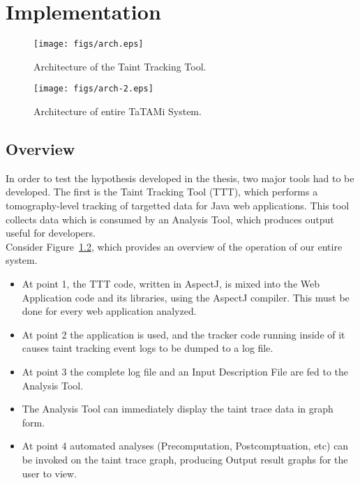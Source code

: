 \documentclass[msc,oneside]{ubcthesis}
\begin{document}
\chapter{Implementation}

\begin{figure}[ht]
  \begin{center}
    \texttt{[image: figs/arch.eps]}
    \caption[Architecture of the Taint Tracking Tool.]{\label{fig:arch} Architecture of the Taint Tracking Tool.}
  \end{center}
\end{figure}

\begin{figure}[ht]
  \begin{center}
    \texttt{[image: figs/arch-2.eps]}
    \caption[Architecture of entire TaTAMi System.]{\label{fig:arch-2} Architecture of entire TaTAMi System.}
  \end{center}
\end{figure}

\section{Overview}

In order to test the hypothesis developed in the thesis, two major tools had to be developed. The first is the Taint Tracking Tool (TTT), which performs a tomography-level tracking of targetted data for Java web applications. This tool collects data which is consumed by an Analysis Tool, which produces output useful for developers.\\

Consider Figure~\ref{fig:arch-2}, which provides an overview of the operation of our entire system.
\begin{itemize}
\item At point 1, the TTT code, written in AspectJ, is mixed into the Web Application code and its libraries, using the AspectJ compiler. This must be done for every web application analyzed.
\item At point 2 the application is used, and the tracker code running inside of it causes taint tracking event logs to be dumped to a log file.
\item At point 3 the complete log file and an Input Description File are fed to the Analysis Tool.
\item The Analysis Tool can immediately display the taint trace data in graph form.
\item At point 4 automated analyses (Precomputation, Postcomptuation, etc) can be invoked on the taint trace graph, producing Output result graphs for the user to view.
\end{itemize}
\end{document}
